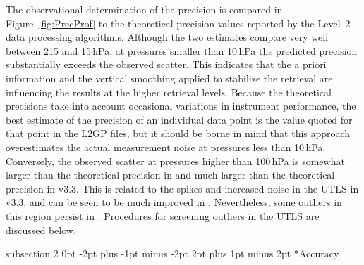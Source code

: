 \documentclass[11pt,draft]{report}
\makeatletter
\renewcommand{\subsection}{\@startsection%
  {subsection}%
  {2}%
  {0pt}%
  {-2pt plus -1pt minus -2pt}%
  {2pt plus 1pt minus 2pt}%
  {\large\sffamily\fontseries{sb}\selectfont\flushleft\color{SectionColor}\figureversion{tabular}}}%
\makeatother
\begin{document}
The observational determination of the precision is compared in
Figure~\ref{fig:PrecProf} to the theoretical precision values reported
by the Level~2 data processing algorithms.  Although the two estimates
compare very well between 215 and 15\,hPa, at pressures smaller than
10\,hPa the predicted precision substantially exceeds the observed
scatter.  This indicates that the a priori information and the vertical
smoothing applied to stabilize the retrieval are influencing the results
at the higher retrieval levels.  Because the theoretical precisions take
into account occasional variations in instrument performance, the best
estimate of the precision of an individual data point is the value
quoted for that point in the L2GP files, but it should be borne in mind
that this approach overestimates the actual measurement noise at
pressures less than 10\,hPa.  Conversely, the observed scatter at
pressures higher than 100\,hPa is somewhat larger than the theoretical
precision in \thisv and much larger than the theoretical precision in
v3.3.  This is related to the spikes and increased noise in the UTLS in
v3.3, and can be seen to be much improved in \thisv.  Nevertheless, some
outliers in this region persist in \thisv.  Procedures for screening
outliers in the UTLS are discussed below.

\subsection*{Accuracy}
\end{document}
